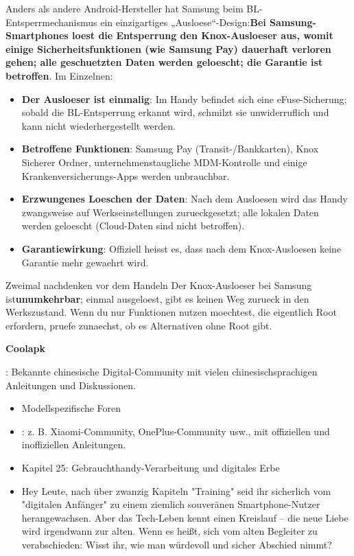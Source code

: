 
Anders als andere Android-Hersteller hat Samsung beim BL-Entsperrmechanismus ein einzigartiges „Ausloese“-Design:\textbf{Bei Samsung-Smartphones loest die Entsperrung den Knox-Ausloeser aus, womit einige Sicherheitsfunktionen (wie Samsung Pay) dauerhaft verloren gehen; alle geschuetzten Daten werden geloescht; die Garantie ist betroffen}. Im Einzelnen:

\begin{itemize}
  \item \textbf{Der Ausloeser ist einmalig}: Im Handy befindet sich eine eFuse-Sicherung; sobald die BL-Entsperrung erkannt wird, schmilzt sie unwiderruflich und kann nicht wiederhergestellt werden.
  \item \textbf{Betroffene Funktionen}: Samsung Pay (Transit-/Bankkarten), Knox Sicherer Ordner, unternehmenstaugliche MDM-Kontrolle und einige Krankenversicherungs-Apps werden unbrauchbar.
  \item \textbf{Erzwungenes Loeschen der Daten}: Nach dem Ausloesen wird das Handy zwangsweise auf Werkseinstellungen zurueckgesetzt; alle lokalen Daten werden geloescht (Cloud-Daten sind nicht betroffen).
  \item \textbf{Garantiewirkung}: Offiziell heisst es, dass nach dem Knox-Ausloesen keine Garantie mehr gewaehrt wird.
\end{itemize}

\begin{tcbwarn}{Zweimal nachdenken vor dem Handeln}
Der Knox-Ausloeser bei Samsung ist\textbf{unumkehrbar}; einmal ausgeloest, gibt es keinen Weg zurueck in den Werkszustand. Wenn du nur Funktionen nutzen moechtest, die eigentlich Root erfordern, pruefe zunaechst, ob es Alternativen ohne Root gibt.

\end{tcbwarn}

\textbf{Coolapk}\par

: Bekannte chinesische Digital-Community mit vielen chinesischsprachigen Anleitungen und Diskussionen.

\begin{itemize}
  \item Modellspezifische Foren
  \item : z. B. Xiaomi-Community, OnePlus-Community usw., mit offiziellen und inoffiziellen Anleitungen.
  \item Kapitel 25: Gebrauchthandy-Verarbeitung und digitales Erbe
  \item Hey Leute, nach über zwanzig Kapiteln "Training" seid ihr sicherlich vom "digitalen Anfänger" zu einem ziemlich souveränen Smartphone-Nutzer herangewachsen. Aber das Tech-Leben kennt einen Kreislauf – die neue Liebe wird irgendwann zur alten. Wenn es heißt, sich vom alten Begleiter zu verabschieden: Wisst ihr, wie man würdevoll und sicher Abschied nimmt?
\end{itemize}

